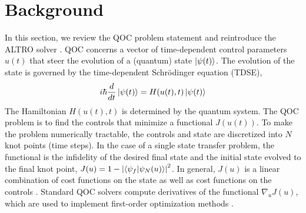 \section{Background \label{sec:background}}
In this section, we
review the QOC problem statement
and reintroduce the ALTRO solver \cite{howell2019altro}.
QOC concerns a vector of time-dependent control parameters $u(t)$
that steer the evolution of a (quantum) state $\ket{\psi(t)}$.
The evolution of the state is governed by the time-dependent
Schr{\"o}dinger equation (TDSE),
\begin{equation}
  i \hbar \frac{d}{dt} \ket{\psi(t)} = H(u(t), t) \ket{\psi(t)}
  \label{eq:tdse}
\end{equation}
The Hamiltonian $H(u(t), t)$ is determined by the quantum system.
The QOC problem is to find the
controls that minimize a functional $J(u(t))$.
To make the problem numerically tractable,
the controls and state are discretized into $N$ knot points (time steps).
In the case of a single state transfer problem, the functional is
the infidelity of the desired final state and the initial state evolved
to the final knot point,
$J(u) = 1 - {\lvert \braket{\psi_{f}}{\psi_{N}(u)} \rvert}^{2}$.
In general, $J(u)$ is a linear combination of cost functions on the state
as well as cost functions on the controls \cite{leung2017speedup}.
Standard QOC solvers compute derivatives of the functional $\nabla_{u} J(u)$,
which are used to implement first-order optimization methods
\cite{machnes2015tunable, khaneja2005optimal, leung2017speedup, goerz2019krotov}.

